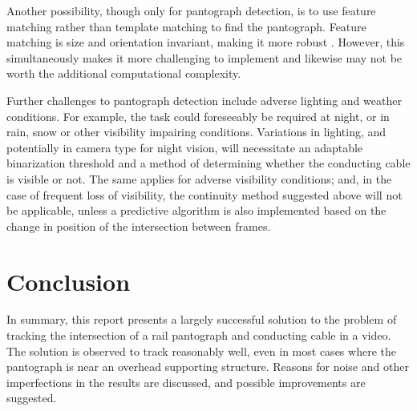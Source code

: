 Another possibility, though only for pantograph detection, is to use feature matching rather than template matching to find the pantograph. Feature matching is size and orientation invariant, making it more robust \cite{opencv_fm}. However, this simultaneously makes it more challenging to implement and likewise may not be worth the additional computational complexity.

Further challenges to pantograph detection include adverse lighting and weather conditions. For example, the task could foreseeably be required at night, or in rain, snow or other visibility impairing conditions. Variations in lighting, and potentially in camera type for night vision, will necessitate an adaptable binarization threshold and a method of determining whether the conducting cable is visible or not. The same applies for adverse visibility conditions; and, in the case of frequent loss of visibility, the continuity method suggested above will not be applicable, unless a predictive algorithm is also implemented based on the change in position of the intersection between frames.

\section{Conclusion}

In summary, this report presents a largely successful solution to the problem of tracking the intersection of a rail pantograph and conducting cable in a video. The solution is observed to track reasonably well, even in most cases where the pantograph is near an overhead supporting structure. Reasons for noise and other imperfections in the results are discussed, and possible improvements are suggested.
